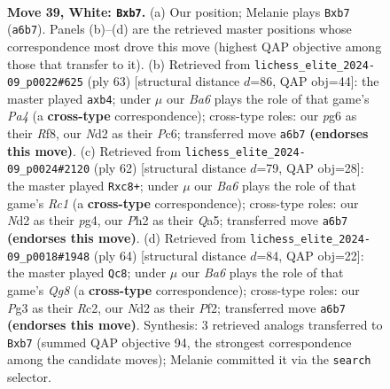 \documentclass[11pt]{article}
\begin{document}
\clearpage

\begin{figure}[p]\centering
\begin{subfigure}{0.46\textwidth}\centering
\resizebox{\linewidth}{!}{%
\newchessgame
\chessboard[
  setfen={2b2k2/1r3p2/B4np1/6qp/P7/6P1/1p1NRP1P/4R1K1 w - - 0 39},
  showmover=false,
  pgfstyle=straightmove, color=movearrow, markmove={a6-b7}
]}
\caption{}
\end{subfigure}\hfill
\begin{subfigure}{0.46\textwidth}\centering
\resizebox{\linewidth}{!}{%
\newchessgame
\chessboard[
  setfen={5rk1/6p1/2pNpr2/p1Q5/1R3P1P/5KP1/P7/3R4 b - - 0 32},
  showmover=false,
  pgfstyle=straightmove, color=movearrow, markmove={a5-b4}
]}
\caption{}
\end{subfigure}
\\[4pt]
\begin{subfigure}{0.46\textwidth}\centering
\resizebox{\linewidth}{!}{%
\newchessgame
\chessboard[
  setfen={1kr5/1p1r3p/5p2/QP1qp3/6pP/6P1/5P2/2R2RK1 w - - 1 32},
  showmover=false,
  pgfstyle=straightmove, color=movearrow, markmove={c1-c8}
]}
\caption{}
\end{subfigure}\hfill
\begin{subfigure}{0.46\textwidth}\centering
\resizebox{\linewidth}{!}{%
\newchessgame
\chessboard[
  setfen={6Q1/2p1kr2/1p2np2/p3p3/4q3/2P5/1PR2PPP/1K1R4 w - - 4 33},
  showmover=false,
  pgfstyle=straightmove, color=movearrow, markmove={g8-c8}
]}
\caption{}
\end{subfigure}
\caption{\textbf{Move 39, White: \texttt{Bxb7}.} (a) Our position; Melanie plays \texttt{Bxb7} (\texttt{a6b7}). Panels (b)--(d) are the retrieved master positions whose correspondence most drove this move (highest QAP objective among those that transfer to it). (b) Retrieved from \texttt{lichess\_elite\_2024-09\_p0022\#625} (ply 63) [structural distance $d$=86, QAP obj=44]: the master played \texttt{axb4}; under $\mu$ our \emph{Ba6} plays the role of that game's \emph{Pa4} (a \textbf{cross-type} correspondence); cross-type roles: our \emph{p}g6 as their \emph{R}f8, our \emph{N}d2 as their \emph{P}c6; transferred move \texttt{a6b7} \textbf{(endorses this move)}. (c) Retrieved from \texttt{lichess\_elite\_2024-09\_p0024\#2120} (ply 62) [structural distance $d$=79, QAP obj=28]: the master played \texttt{Rxc8+}; under $\mu$ our \emph{Ba6} plays the role of that game's \emph{Rc1} (a \textbf{cross-type} correspondence); cross-type roles: our \emph{N}d2 as their \emph{p}g4, our \emph{P}h2 as their \emph{Q}a5; transferred move \texttt{a6b7} \textbf{(endorses this move)}. (d) Retrieved from \texttt{lichess\_elite\_2024-09\_p0018\#1948} (ply 64) [structural distance $d$=84, QAP obj=22]: the master played \texttt{Qc8}; under $\mu$ our \emph{Ba6} plays the role of that game's \emph{Qg8} (a \textbf{cross-type} correspondence); cross-type roles: our \emph{P}g3 as their \emph{R}c2, our \emph{N}d2 as their \emph{P}f2; transferred move \texttt{a6b7} \textbf{(endorses this move)}. Synthesis: 3 retrieved analogs transferred to \texttt{Bxb7} (summed QAP objective 94, the strongest correspondence among the candidate moves); Melanie committed it via the \texttt{search} selector.}
\label{fig:thought-m76}
\end{figure}
\end{document}
